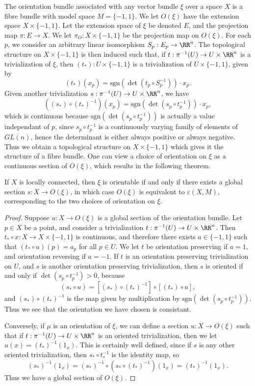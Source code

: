 The orientation bundle associated with any vector bundle $\xi$ over a space $X$ is a fibre bundle with model space $M = \{ -1, 1 \}$. We let $O(\xi)$ have the extension space $X \times \{ -1, 1 \}$. Let the extension space of $\xi$ be denoted $E$, and the projection map $\pi: E \to X$. We let $\pi_O: X \times \{ -1, 1 \}$ be the projection map on $O(\xi)$. For each $p$, we consider an arbitrary linear isomorphism $S_p: E_p \to \RR^n$. The topological structure on $X \times \{ -1, 1 \}$ is then induced such that, if $t: \pi^{-1}(U) \to U \times \RR^n$ is a trivialization of $\xi$, then $(t_*): U \times \{ -1, 1 \}$ is a trivialization of $U \times \{ -1, 1 \}$, given by
%
\[ (t_*)(x_p) = \text{sgn}(\det(t_p \circ S_p^{-1})) \cdot x_p. \]
%
Given another trivialization $s: \pi^{-1}(U) \to U \times \RR^n$, we have
%
\[ ((s_*) \circ (t_*)^{-1})(x_p) = \text{sgn}(\det(s_p \circ t_p^{-1})) \cdot x_p, \]
%
which is continuous because $\text{sgn}(\det(s_p \circ t_p^{-1}))$ is actually a value independant of $p$, since $s_p \circ t_p^{-1}$ is a continuously varying family of elements of $GL(n)$, hence the determinant is either always positive or always negative. Thus we obtain a topological structure on $X \times \{ -1, 1 \}$ which gives it the structure of a fibre bundle. One can view a choice of orientation on $\xi$ as a continuous section of $O(\xi)$, which results in the following theorem.

\begin{theorem}
    If $X$ is locally connected, then $\xi$ is orientable if and only if there exists a global section $s: X \to O(\xi)$, in which case $O(\xi)$ is equivalent to $\varepsilon(X,M)$, corresponding to the two choices of orientation on $\xi$.
\end{theorem}
\begin{proof}
    Suppose $u: X \to O(\xi)$ is a global section of the orientation bundle. Let $p \in X$ be a point, and consider a trivialization $t: \pi^{-1}(U) \to U \times \RR^n$. Then $t_* \circ x: X \to X \times \{ -1, 1 \}$ is continuous, and therefore there exists $a \in \{ -1, 1 \}$ such that $(t_* \circ u)(p) = a_p$ for all $p \in U$. We let $t$ be orientation preserving if $a = 1$, and orientation reversing if $a = -1$. If $t$ is an orientation preserving trivialization on $U$, and $s$ is another orientation preserving trivialization, then $s$ is oriented if and only if $\det(s_p \circ t_p^{-1}) > 0$, because
    \[ (s_* \circ u) = [(s_*) \circ (t_*)^{-1}] \circ [(t_*) \circ u], \]
    and $(s_*) \circ (t_*)^{-1}$ is the map given by multiplication by $\text{sgn}(\det(s_p \circ t_p^{-1}))$. Thus we see that the orientation we have chosen is consistant.

    Conversely, if $\mu$ is an orientation of $\xi$, we can define a section $u: X \to O(\xi)$ such that if $t: \pi^{-1}(U) \to U \times \RR^n$ is an oriented trivialization, then we let $u(x) = (t_*)^{-1}(1_x)$. This is certainly well defined, since if $s$ is any other oriented trivialization, then $s_* \circ t_*^{-1}$ is the identity map, so
    \[ (s_*)^{-1}(1_x) = (s_*)^{-1} \circ (s_* \circ (t_*)^{-1})(1_x) = (t_*)^{-1}(1_x). \]
    Thus we have a global section of $O(\xi)$.
\end{proof}

